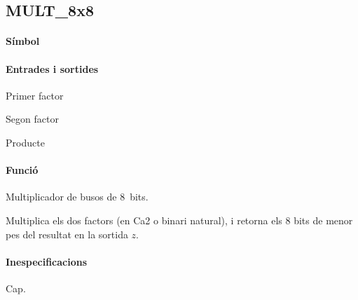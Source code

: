 \subsection{\label{sub:\projectname-MULT_8x8} \textsf{MULT\_8x8}}

\paragraph{Símbol}

\begin{center}  \end{center}

\paragraph{Entrades i sortides}

\begin{where}
\item[\nodenamerange{a}{7}{0}] Primer factor
\item[\nodenamerange{b}{7}{0}] Segon factor
\item[\nodenamerange{z}{7}{0}] Producte
\end{where}

\paragraph{Funció}

Multiplicador de busos de 8~bits.

Multiplica els dos factors (en Ca2 o binari natural), i retorna els 8 bits de menor pes del resultat en la sortida $z$.

\paragraph{Inespecificacions}

Cap.

\vspace{1cm}
